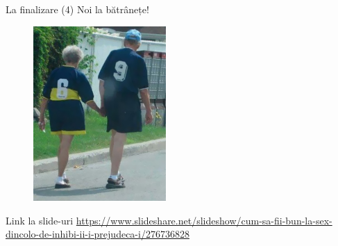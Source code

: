 \documentclass{simple}
\begin{document}
\begin{frame}{La finalizare (4)}
  \centering
  \pause
  \Large
  Noi la bătrânețe! \\
  \vspace{5mm}
  \pause
  \begin{figure}
    \centering
    \includegraphics[width=0.45\textwidth]{img/old-couple-6-and-9.jpg}
  \end{figure}
\end{frame}

\begin{frame}{Link la slide-uri}
  \url{https://www.slideshare.net/slideshow/cum-sa-fii-bun-la-sex-dincolo-de-inhibi-ii-i-prejudeca-i/276736828}
\end{frame}
\end{document}
